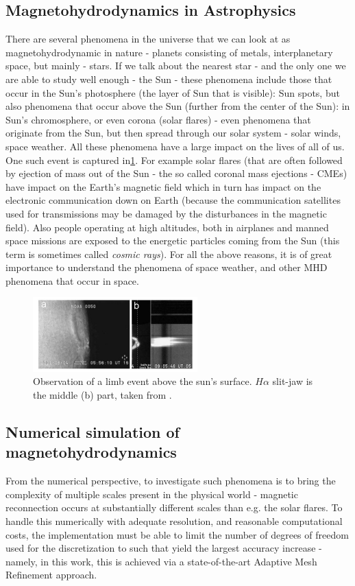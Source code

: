 \documentclass[journal,transmag]{IEEEtran}
\begin{document}
\subsection{Magnetohydrodynamics in Astrophysics}
There are several phenomena in the universe that we can look at as magnetohydrodynamic in nature - planets consisting of metals, interplanetary space, but mainly - stars. If we talk about the nearest star - and the only one we are able to study well enough - the Sun - these phenomena include those that occur in the Sun's photosphere (the layer of Sun that is visible): Sun spots, but also phenomena that occur above the Sun (further from the center of the Sun): in Sun's chromosphere, or even corona (solar flares) - even phenomena that originate from the Sun, but then spread through our solar system - solar winds, space weather. All these phenomena have a large impact on the lives of all of us. One such event is captured in\ref{figure:observation}. For example solar flares (that are often followed by ejection of mass out of the Sun - the so called coronal mass ejections - CMEs) have impact on the Earth's magnetic field which in turn has impact on the electronic communication down on Earth (because the communication satellites used for transmissions may be damaged by the disturbances in the magnetic field). Also people operating at high altitudes, both in airplanes and manned space missions are exposed to the energetic particles coming from the Sun (this term is sometimes called \textit{cosmic rays}). For all the above reasons, it is of great importance to understand the phenomena of space weather, and other MHD phenomena that occur in space.
\begin{figure}[!t]
\centering
\includegraphics[width=2.5in]{figure2fromHalpha.jpg}
\caption{Observation of a limb event above the sun's surface. $H\alpha$ slit-jaw is the middle (b) part, taken from \cite{miraClanek}.}
\label{figure:observation}
\end{figure}

\subsection{Numerical simulation of magnetohydrodynamics}
From the numerical perspective, to investigate such phenomena is to bring the complexity of multiple scales present in the physical world - magnetic reconnection occurs at substantially different scales than e.g. the solar flares. To handle this numerically with adequate resolution, and reasonable computational costs, the implementation must be able to limit the number of degrees of freedom used for the discretization to such that yield the largest accuracy increase - namely, in this work, this is achieved via a state-of-the-art Adaptive Mesh Refinement approach.
\end{document}
